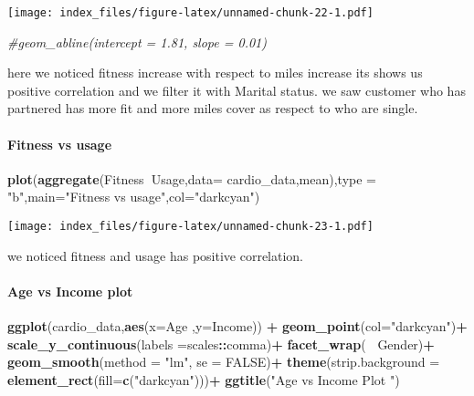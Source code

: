 \documentclass[
]{article}
\newenvironment{Shaded}{\begin{snugshade}}{\end{snugshade}}
\newcommand{\CommentTok}[1]{\textcolor[rgb]{0.56,0.35,0.01}{\textit{#1}}}
\newcommand{\DataTypeTok}[1]{\textcolor[rgb]{0.13,0.29,0.53}{#1}}
\newcommand{\KeywordTok}[1]{\textcolor[rgb]{0.13,0.29,0.53}{\textbf{#1}}}
\newcommand{\NormalTok}[1]{#1}
\newcommand{\OperatorTok}[1]{\textcolor[rgb]{0.81,0.36,0.00}{\textbf{#1}}}
\newcommand{\OtherTok}[1]{\textcolor[rgb]{0.56,0.35,0.01}{#1}}
\newcommand{\StringTok}[1]{\textcolor[rgb]{0.31,0.60,0.02}{#1}}
\begin{document}
\texttt{[image: index\_files/figure-latex/unnamed-chunk-22-1.pdf]}

\begin{Shaded}
\begin{Highlighting}[]
  \CommentTok{#geom_abline(intercept = 1.81, slope = 0.01)}
\end{Highlighting}
\end{Shaded}

here we noticed fitness increase with respect to miles increase its
shows us positive correlation and we filter it with Marital status. we
saw customer who has partnered has more fit and more miles cover as
respect to who are single.

\hypertarget{fitness-vs-usage}{%
\paragraph{Fitness vs usage}\label{fitness-vs-usage}}

\begin{Shaded}
\begin{Highlighting}[]
\KeywordTok{plot}\NormalTok{(}\KeywordTok{aggregate}\NormalTok{(Fitness}\OperatorTok{~}\NormalTok{Usage,}\DataTypeTok{data=}\NormalTok{ cardio_data,mean),}\DataTypeTok{type =} \StringTok{"b"}\NormalTok{,}\DataTypeTok{main=}\StringTok{"Fitness vs usage"}\NormalTok{,}\DataTypeTok{col=}\StringTok{"darkcyan"}\NormalTok{)}
\end{Highlighting}
\end{Shaded}

\texttt{[image: index\_files/figure-latex/unnamed-chunk-23-1.pdf]}

we noticed fitness and usage has positive correlation.

\hypertarget{age-vs-income-plot}{%
\paragraph{Age vs Income plot}\label{age-vs-income-plot}}

\begin{Shaded}
\begin{Highlighting}[]
\KeywordTok{ggplot}\NormalTok{(cardio_data,}\KeywordTok{aes}\NormalTok{(}\DataTypeTok{x=}\NormalTok{Age ,}\DataTypeTok{y=}\NormalTok{Income)) }\OperatorTok{+}
\StringTok{  }\KeywordTok{geom_point}\NormalTok{(}\DataTypeTok{col=}\StringTok{"darkcyan"}\NormalTok{)}\OperatorTok{+}
\StringTok{  }\KeywordTok{scale_y_continuous}\NormalTok{(}\DataTypeTok{labels =}\NormalTok{scales}\OperatorTok{::}\NormalTok{comma)}\OperatorTok{+}
\StringTok{  }\KeywordTok{facet_wrap}\NormalTok{(}\OperatorTok{~}\StringTok{ }\NormalTok{Gender)}\OperatorTok{+}
\StringTok{  }\KeywordTok{geom_smooth}\NormalTok{(}\DataTypeTok{method =} \StringTok{"lm"}\NormalTok{, }\DataTypeTok{se =} \OtherTok{FALSE}\NormalTok{)}\OperatorTok{+}
\StringTok{  }\KeywordTok{theme}\NormalTok{(}\DataTypeTok{strip.background =} \KeywordTok{element_rect}\NormalTok{(}\DataTypeTok{fill=}\KeywordTok{c}\NormalTok{(}\StringTok{"darkcyan"}\NormalTok{)))}\OperatorTok{+}
\StringTok{  }\KeywordTok{ggtitle}\NormalTok{(}\StringTok{"Age vs Income Plot "}\NormalTok{)}
\end{Highlighting}
\end{Shaded}
\end{document}
